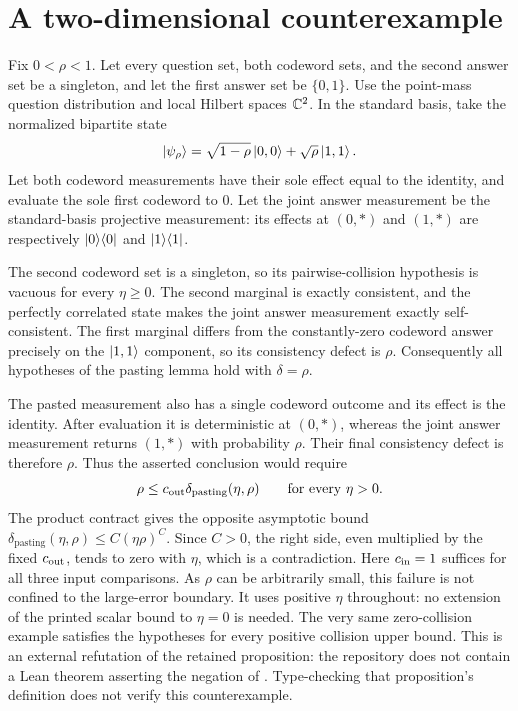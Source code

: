 \documentclass[11pt]{article}
\begin{document}
\section{A two-dimensional counterexample}

Fix $0<\rho<1$.  Let every question set, both codeword sets, and the second
answer set be a singleton, and let the first answer set be $\{0,1\}$.  Use the
point-mass question distribution and local Hilbert spaces $\mathbb{C}^2$.  In the
standard basis, take the normalized bipartite state
\[
  \ket{\psi_\rho}
    = \sqrt{1-\rho}\ket{0,0}+\sqrt{\rho}\ket{1,1}.
\]
Let both codeword measurements have their sole effect equal to the identity,
and evaluate the sole first codeword to $0$.  Let the joint answer measurement
be the standard-basis projective measurement: its effects at $(0,*)$ and
$(1,*)$ are respectively $\ket{0}\!\bra{0}$ and $\ket{1}\!\bra{1}$.

The second codeword set is a singleton, so its pairwise-collision hypothesis is
vacuous for every $\eta\geq0$.  The second marginal is exactly consistent, and
the perfectly correlated state makes the joint answer measurement exactly
self-consistent.  The first marginal differs from the constantly-zero
codeword answer precisely on the $\ket{1,1}$ component, so its consistency
defect is $\rho$.  Consequently all hypotheses of the pasting lemma hold with
$\delta=\rho$.

The pasted measurement also has a single codeword outcome and its effect is the
identity.  After evaluation it is deterministic at $(0,*)$, whereas the joint
answer measurement returns $(1,*)$ with probability $\rho$.  Their final
consistency defect is therefore $\rho$.  Thus the asserted conclusion would
require
\[
  \rho \leq c_{\rm out}\delta_{\mathrm{pasting}}(\eta,\rho)
  \qquad\text{for every }\eta>0.
\]
The product contract gives the opposite asymptotic bound
$\delta_{\mathrm{pasting}}(\eta,\rho)\leq C(\eta\rho)^C$.  Since $C>0$, the
right side, even multiplied by the fixed $c_{\rm out}$, tends to zero with
$\eta$, which is a contradiction. Here $c_{\rm in}=1$ suffices for all
three input comparisons. As $\rho$ can
be arbitrarily small, this failure is not confined to the large-error boundary.
It uses positive $\eta$ throughout: no extension of the printed scalar
bound to $\eta=0$ is needed. The very same zero-collision example satisfies
the hypotheses for every positive collision upper bound. This is an external
refutation of the retained proposition: the repository does not contain a
Lean theorem asserting the negation of . Type-checking
that proposition's definition does not verify this counterexample.
\end{document}
